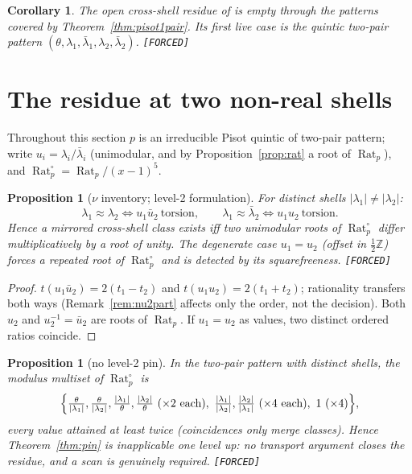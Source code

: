 \documentclass[11pt]{article}
\newcommand{\F}{\textnormal{\texttt{[FORCED]}}}
\newcommand{\Z}{\mathbb{Z}}
\newcommand{\Rat}{\operatorname{Rat}}
\newtheorem{proposition}[theorem]{Proposition}
\newtheorem{corollary}[theorem]{Corollary}
\theoremstyle{definition}
\begin{document}
\begin{corollary}\label{cor:residue-location}
The open cross-shell residue of \cite[Cor.~7.16]{relcharge} is empty through
the patterns covered by Theorem~\ref{thm:pisot1pair}. Its first live case is
the quintic two-pair pattern $(\theta,\lambda_1,\bar\lambda_1,\lambda_2,\bar\lambda_2)$. \F
\end{corollary}

\section{The residue at two non-real shells}\label{sec:residue}

Throughout this section $p$ is an irreducible Pisot quintic of two-pair pattern;
write $u_i=\lambda_i/\bar\lambda_i$ (unimodular, and by
Proposition~\ref{prop:rat} a root of $\Rat_p$), and
$\Rat_p^{\circ}=\Rat_p/(x-1)^5$.

\begin{proposition}[$\nu$ inventory; level-2 formulation]\label{prop:nuinv}
For distinct shells $|\lambda_1|\neq|\lambda_2|$:
\[
\lambda_1\approx\lambda_2\iff u_1\bar u_2\ \text{torsion},\qquad
\lambda_1\approx\bar\lambda_2\iff u_1u_2\ \text{torsion}.
\]
Hence a mirrored cross-shell class exists iff two unimodular roots of
$\Rat_p^{\circ}$ differ multiplicatively by a root of unity. The degenerate
case $u_1=u_2$ (offset in $\tfrac12\Z$) forces a repeated root of
$\Rat_p^{\circ}$ and is detected by its squarefreeness. \F
\end{proposition}

\begin{proof}
$t(u_1\bar u_2)=2(t_1-t_2)$ and $t(u_1u_2)=2(t_1+t_2)$; rationality transfers
both ways (Remark~\ref{rem:nu2part} affects only the order, not the decision).
Both $u_2$ and $u_2^{-1}=\bar u_2$ are roots of $\Rat_p$. If $u_1=u_2$ as
values, two distinct ordered ratios coincide.
\end{proof}

\begin{proposition}[no level-2 pin]\label{prop:nopin}
In the two-pair pattern with distinct shells, the modulus multiset of
$\Rat_p^{\circ}$ is
\[
\Bigl\{\tfrac{\theta}{|\lambda_1|},\tfrac{\theta}{|\lambda_2|},
\tfrac{|\lambda_1|}{\theta},\tfrac{|\lambda_2|}{\theta}\ (\times2\ \text{each}),\
\tfrac{|\lambda_1|}{|\lambda_2|},\tfrac{|\lambda_2|}{|\lambda_1|}\ (\times4\ \text{each}),\
1\ (\times4)\Bigr\},
\]
every value attained at least twice (coincidences only merge classes). Hence
Theorem~\ref{thm:pin} is inapplicable one level up: no transport argument closes
the residue, and a scan is genuinely required. \F
\end{proposition}
\end{document}
